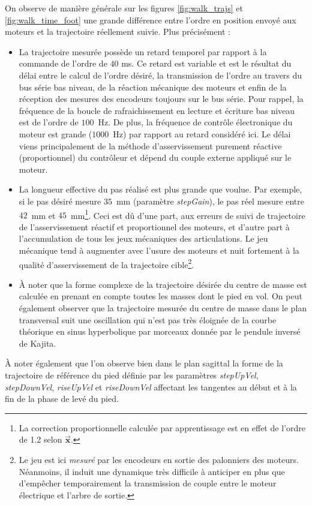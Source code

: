 On observe de manière générale sur les figures \ref{fig:walk_trajs} et
\ref{fig:walk_time_foot} une grande différence entre l'ordre en position 
envoyé aux moteurs et la trajectoire réellement suivie. Plus précisément :
\begin{itemize}
    \item La trajectoire mesurée possède un retard temporel par rapport 
        à la commande de l'ordre de $40$ ms. 
        Ce retard est variable et est le résultat du délai entre 
        le calcul de l'ordre désiré, la transmission de l'ordre au travers
        du bus série bas niveau, de la réaction mécanique des moteurs
        et enfin de la réception des mesures des encodeurs toujours sur le bus série.
        Pour rappel, la fréquence de la boucle de rafraichissement 
        en lecture et écriture bas niveau est de l'ordre de $100$~Hz.
        De plus, la fréquence de contrôle électronique
        du moteur est grande ($1000$~Hz) par rapport au retard considéré ici. 
        Le délai viens principalement de la méthode d'asservissement 
        purement réactive (proportionnel) du contrôleur et dépend du couple externe 
        appliqué sur le moteur.
    \item La longueur effective du pas réalisé est plus grande que voulue.
        Par exemple, si le pas désiré mesure $35$~mm (paramètre \textit{stepGain}), 
        le pas réel mesure entre $42$~mm et $45$~mm\footnote{La correction proportionnelle 
        calculée par apprentissage est en effet de l'ordre de 1.2 selon $\bm{\vec{x}}$.}.
        Ceci est dû d'une part, aux erreurs de suivi de trajectoire de l'asservissement
        réactif et proportionnel des moteurs, et d'autre part à l'accumulation de tous 
        les jeux mécaniques des articulations.
        Le jeu mécanique tend à augmenter avec l'usure des moteurs 
        et nuit fortement à la qualité d'asservissement
        de la trajectoire cible\footnote{Le jeu est ici \textit{mesuré} par les encodeurs 
        en sortie des palonniers des moteurs. Néanmoins, il induit une dynamique très 
        difficile à anticiper en plus que d'empêcher temporairement la transmission de 
        couple entre le moteur électrique et l'arbre de sortie.}.
    \item À noter que la forme complexe de la trajectoire désirée du centre de masse
        est calculée en prenant en compte toutes les masses dont le pied en vol.
        On peut également observer que la trajectoire mesurée du centre de masse 
        dans le plan transversal suit une oscillation qui n'est pas très éloignée 
        de la courbe théorique en sinus hyperbolique par morceaux donnée par 
        le pendule inversé de Kajita.
\end{itemize}
À noter également que l'on observe bien dans le plan sagittal la forme
de la trajectoire de référence du pied définie par les paramètres
\textit{stepUpVel}, \textit{stepDownVel}, \textit{riseUpVel} et \textit{riseDownVel}
affectant les tangentes au début et à la fin de la phase de levé du pied.

